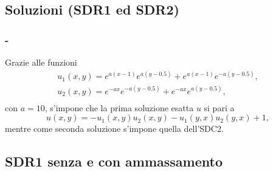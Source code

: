 \documentclass[11pt]{beamer}
\begin{document}
            \subsection{Soluzioni (SDR1 ed SDR2)}
          
                \begin{frame}\frametitle{\titoloSez{} - \insertsubsection{}}
                    Grazie alle funzioni
                    \begin{equation*}
                        \begin{gathered}
                            u_1(x,y)=e^{a(x-1)}e^{a(y-0.5)}+e^{a(x-1)}e^{-a(y-0.5)},\\
                            u_2(x,y)=e^{-ax}e^{-a(y-0.5)}+e^{-ax}e^{a(y-0.5)},\\
                        \end{gathered}
                    \end{equation*}
                    con $a=10$, s'impone che la prima soluzione esatta $u$ si pari a
                    \begin{equation}
                        u(x,y)=-u_1(x,y)u_2(x,y)-u_1(y,x)u_2(y,x)+1,
                        \label{eqSoluzioneEsattaSDR1}
                    \end{equation}
                    mentre come seconda soluzione s'impone quella dell'SDC2.
                \end{frame}

            \subsection{SDR1 senza e con ammassamento}
\end{document}
